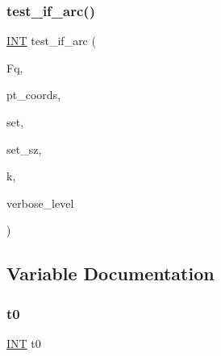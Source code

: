 \subsubsection{\texorpdfstring{test\+\_\+if\+\_\+arc()}{test\_if\_arc()}}
{\footnotesize\ttfamily \mbox{\hyperlink{galois_8h_a09fddde158a3a20bd2dcadb609de11dc}{I\+NT}} test\+\_\+if\+\_\+arc (\begin{DoxyParamCaption}\item[{\mbox{\hyperlink{classfinite__field}{finite\+\_\+field}} $\ast$}]{Fq,  }\item[{\mbox{\hyperlink{galois_8h_a09fddde158a3a20bd2dcadb609de11dc}{I\+NT}} $\ast$}]{pt\+\_\+coords,  }\item[{\mbox{\hyperlink{galois_8h_a09fddde158a3a20bd2dcadb609de11dc}{I\+NT}} $\ast$}]{set,  }\item[{\mbox{\hyperlink{galois_8h_a09fddde158a3a20bd2dcadb609de11dc}{I\+NT}}}]{set\+\_\+sz,  }\item[{\mbox{\hyperlink{galois_8h_a09fddde158a3a20bd2dcadb609de11dc}{I\+NT}}}]{k,  }\item[{\mbox{\hyperlink{galois_8h_a09fddde158a3a20bd2dcadb609de11dc}{I\+NT}}}]{verbose\+\_\+level }\end{DoxyParamCaption})}



\subsection{Variable Documentation}
\mbox{\label{hill_8_c_a4268f4fe222ffb119218a0199f5e1904}} 
\subsubsection{\texorpdfstring{t0}{t0}}
{\footnotesize\ttfamily \mbox{\hyperlink{galois_8h_a09fddde158a3a20bd2dcadb609de11dc}{I\+NT}} t0}

